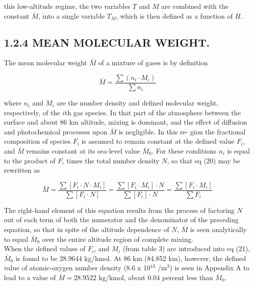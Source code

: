 \documentclass{article}
\begin{document}
\noindent this low-altitude regime, the two variables \(T\) and \(M\) are combined with the constant \(\bar{M}\), into a single variable \(T_M\), which is then defined as a function of \(H\).

\subsection*{1.2.4 MEAN MOLECULAR WEIGHT.}
The mean molecular weight \(\bar{M}\) of a mixture of gases is by definition

\begin{equation}
 \bar{M} = \frac{\sum (n_i \cdot M_i)}{\sum n_i} \tag{20}
\end{equation}

where \(n_i\) and \(M_i\) are the number density and defined molecular weight, respectively, of the \(i\)th gas species. In that part of the atmosphere between the surface and about 86 km altitude, mixing is dominant, and the effect of diffusion and photochemical processes upon \(\bar{M}\) is negligible. In this re- gion the fractional composition of species \(F_i\) is assumed to remain constant at the defined value \(F_i\), and \(\bar{M}\) remains constant at its sea-level value \(\bar{M}_0\). For these conditions \(n_i\) is equal to the product of \(F_i\) times the total number density \(N\), so that eq (20) may be rewritten as

\begin{equation}
 \bar{M} = \frac{\sum [F_i \cdot N \cdot M_i]}{\sum [F_i \cdot N]} = \frac{\sum [F_i \cdot M_i] \cdot N}{\sum [F_i] \cdot N} = \frac{\sum [F_i \cdot M_i]}{\sum F_i} \tag{21}
\end{equation}

The right-hand element of this equation results from the process of factoring \(N\) out of each term of both the numerator and the denominator of the preceding equation, so that in spite of the altitude dependence of \(N\), \(\bar{M}\) is seen analytically to equal \(\bar{M}_0\) over the entire altitude region of complete mixing.\\

When the defined values of \(F_i\), and \(M_i\) (from table 3) are introduced into eq (21), \(\bar{M}_0\) is found to be 28.9644 kg/kmol. At 86 km (84.852 km), however, the defined value of atomic-oxygen number density (8.6 x 10\(^{13}\) /m\(^3\)) is seen in Appendix A to lead to a value of \(\bar{M} = 28.9522\) kg/kmol, about 0.04 percent less than \(\bar{M}_0\).\\
\end{document}
